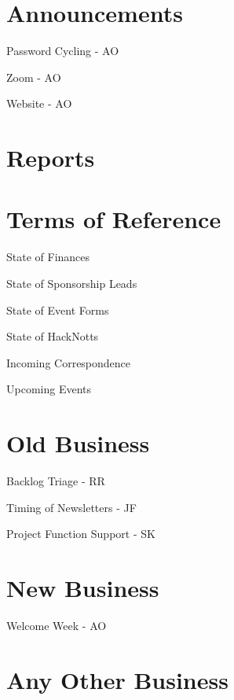 \documentclass[14pt,agenda]{meetingmins}
\begin{document}
\maketitle

\section{Announcements}
\begin{items}
\item {Password Cycling - AO}
\item {Zoom - AO}
\item {Website - AO}
\end{items}

\section{Reports}

\section{Terms of Reference}
\begin{items}
\item {State of Finances}
\item {State of Sponsorship Leads}
\item {State of Event Forms}
\item {State of HackNotts}
\item {Incoming Correspondence}
\item {Upcoming Events}
\end{items}

\section{Old Business}
\begin{items}
\item {Backlog Triage - RR}
\item {Timing of Newsletters - JF} 
\item {Project Function Support - SK}
\end{items}

\section{New Business}
\begin{items}
\item {Welcome Week - AO}
\end{items}

\section{Any Other Business}

\vspace{1em}
\end{document}
